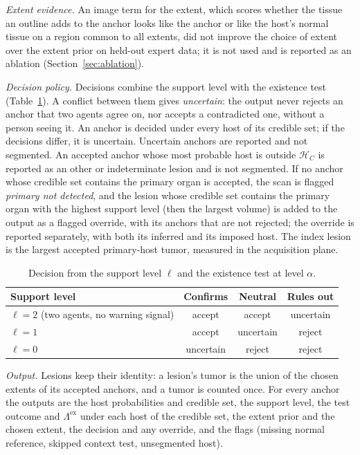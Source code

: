 \documentclass[fleqn,10pt]{olplainarticle}
\begin{document}
\emph{Extent evidence.} An image term for the extent, which scores whether the tissue an outline adds to the anchor
looks like the anchor or like the host's normal tissue on a region common to all extents, did not improve the choice of
extent over the extent prior on held-out expert data; it is not used and is reported as an ablation
(Section~\ref{sec:ablation}).

\emph{Decision policy.} Decisions combine the support level with the existence test (Table~\ref{tab:decision}). A
conflict between them gives \emph{uncertain}: the output never rejects an anchor that two agents agree on, nor accepts a
contradicted one, without a person seeing it. An anchor is decided under every host of its credible set; if the decisions
differ, it is uncertain. Uncertain anchors are reported and not segmented. An accepted anchor whose most probable host is
outside $\mathcal{H}_C$ is reported as an other or indeterminate lesion and is not segmented. If no anchor whose credible set
contains the primary organ is accepted, the scan is flagged \emph{primary not detected}, and the lesion whose credible set
contains the primary organ with the highest support level (then the largest volume) is added to the output as a flagged
override, with its anchors that are not rejected; the override is reported separately, with both its inferred and its
imposed host. The index lesion is the largest accepted primary-host tumor, measured in the acquisition plane.

\begin{table}[t]
\centering\small
\caption{Decision from the support level $\ell$ and the existence test at level $\alpha$.}
\label{tab:decision}
\begin{tabular}{lccc}
\hline
Support level & Confirms & Neutral & Rules out\\
\hline
$\ell=2$ (two agents, no warning signal) & accept & accept & uncertain\\
$\ell=1$ & accept & uncertain & reject\\
$\ell=0$ & uncertain & reject & reject\\
\hline
\end{tabular}
\end{table}

\emph{Output.} Lesions keep their identity: a lesion's tumor is the union of the chosen extents of its accepted anchors, and a
tumor is counted once. For every anchor the outputs are the host probabilities and credible set, the support level, the
test outcome and $\Lambda^{\mathrm{ex}}$ under each host of the credible set, the extent prior and the chosen extent, the
decision and any override, and the flags (missing normal reference, skipped context test, unsegmented host).
\end{document}
